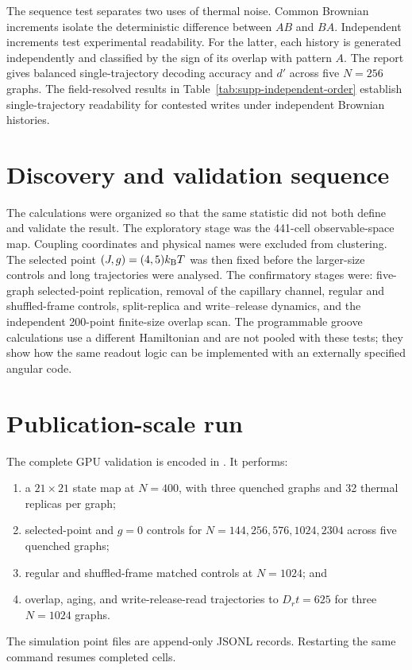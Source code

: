 \documentclass[aps,prl,onecolumn,superscriptaddress,nofootinbib]{revtex4-2}
\begin{document}
The sequence test separates two uses of thermal noise. Common Brownian
increments isolate the deterministic difference between \(AB\) and \(BA\).
Independent increments test experimental readability. For the latter, each
history is generated independently and classified by the sign of its overlap
with pattern \(A\). The report gives balanced single-trajectory decoding
accuracy and \(d'\) across five \(N=256\) graphs. The field-resolved results
in Table~\ref{tab:supp-independent-order} establish single-trajectory
readability for contested writes under independent Brownian histories.

\section{Discovery and validation sequence}

The calculations were organized so that the same statistic did not both
define and validate the result.  The exploratory stage was the 441-cell
observable-space map.  Coupling coordinates and physical names were excluded
from clustering.  The selected point \((J,g)=(4,5)k_{\rm B}T\) was then fixed
before the larger-size controls and long trajectories were analysed.  The
confirmatory stages were: five-graph selected-point replication, removal of
the capillary channel, regular and shuffled-frame controls, split-replica and
write--release dynamics, and the independent 200-point finite-size overlap
scan.  The programmable groove calculations use a different Hamiltonian and
are not pooled with these tests; they show how the same readout logic can be
implemented with an externally specified angular code.

\section{Publication-scale run}

The complete GPU validation is encoded in
.
It performs:
\begin{enumerate}
\item a \(21\times21\) state map at \(N=400\), with three quenched graphs
and 32 thermal replicas per graph;
\item selected-point and \(g=0\) controls for
 \(N=144,256,576,1024,2304\) across five quenched graphs;
\item regular and shuffled-frame matched controls at \(N=1024\); and
\item overlap, aging, and write-release-read trajectories to
 \(D_rt=625\) for three \(N=1024\) graphs.
\end{enumerate}
The simulation point files are append-only JSONL records.  Restarting the
same command resumes completed cells.
\end{document}
